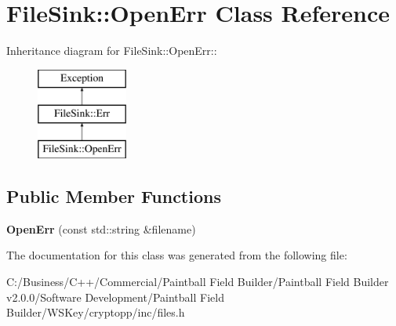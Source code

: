 \hypertarget{class_file_sink_1_1_open_err}{
\section{FileSink::OpenErr Class Reference}
\label{class_file_sink_1_1_open_err}
}
Inheritance diagram for FileSink::OpenErr::\begin{figure}[H]
\begin{center}
\leavevmode
\includegraphics[height=3cm]{class_file_sink_1_1_open_err}
\end{center}
\end{figure}
\subsection*{Public Member Functions}
\begin{DoxyCompactItemize}
\item 
\hypertarget{class_file_sink_1_1_open_err_a583fe9294f2df41f5e1099a65b37be3b}{
{\bfseries OpenErr} (const std::string \&filename)}
\label{class_file_sink_1_1_open_err_a583fe9294f2df41f5e1099a65b37be3b}

\end{DoxyCompactItemize}


The documentation for this class was generated from the following file:\begin{DoxyCompactItemize}
\item 
C:/Business/C++/Commercial/Paintball Field Builder/Paintball Field Builder v2.0.0/Software Development/Paintball Field Builder/WSKey/cryptopp/inc/files.h\end{DoxyCompactItemize}
